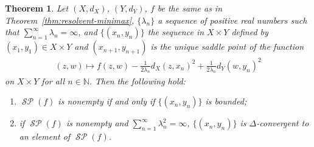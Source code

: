 \documentclass[draft]{amsart}
\numberwithin{equation}{section}
\def\N{\mathbb N}
\DeclareMathOperator{\Saddle}{\mathcal{SP}}
\theoremstyle{plain}
\newtheorem{theorem}{Theorem}[section]
\theoremstyle{definition}
\theoremstyle{remark}
\begin{document}
\begin{theorem}\label{thm:PPA-Saddle}
 Let $(X,d_X)$, $(Y,d_Y)$, $f$ be the same as in 
 Theorem~\ref{thm:resolvent-minimax}, 
 $\{\lambda_n\}$ a sequence of positive real numbers 
 such that $\sum_{n=1}^{\infty}\lambda_n=\infty$, 
 and $\{(x_n,y_n)\}$ the sequence in $X\times Y$ 
 defined by $(x_1,y_1)\in X\times Y$ and 
 $(x_{n+1},y_{n+1})$ is the unique saddle point of 
 the function 
 \begin{align}
  (z,w) \mapsto 
  f(z,w) -\frac{1}{2\lambda _n}d_X(z,x_n)^2
 + \frac{1}{2 \lambda _n}d_Y(w,y_n)^2
 \end{align} 
 on $X\times Y$ for all $n\in \N$. 
 Then the following hold: 
 \begin{enumerate}
  \item[(i)] $\Saddle (f)$ is nonempty if and only if 
 $\{(x_n,y_n)\}$ is bounded; 
  \item[(ii)] if $\Saddle (f)$ is nonempty 
 and $\sum_{n=1}^{\infty}\lambda_n^2=\infty$, 
 $\{(x_n,y_n)\}$ is $\Delta$-convergent to 
 an element of $\Saddle (f)$.  
 \end{enumerate}
\end{theorem}
\end{document}
